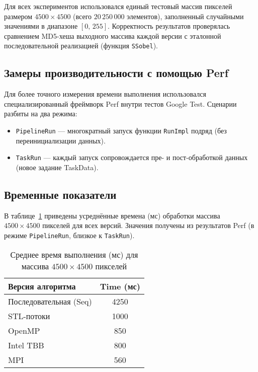 \documentclass[12pt]{article}
\begin{document}
Для всех экспериментов использовался единый тестовый массив пикселей размером $4500 \times 4500$ (всего $20\,250\,000$ элементов), заполненный случайными значениями в диапазоне $[0,\,255]$. Корректность результатов проверялась сравнением MD5-хеша выходного массива каждой версии с эталонной последовательной реализацией (функция \texttt{SSobel}).

\subsection{Замеры производительности с помощью Perf}

Для более точного измерения времени выполнения использовался специализированный фреймворк Perf внутри тестов Google Test. Сценарии разбиты на два режима:
\begin{itemize}
    \item \texttt{PipelineRun} — многократный запуск функции \texttt{RunImpl} подряд (без переинициализации данных).
    \item \texttt{TaskRun} — каждый запуск сопровождается пре- и пост-обработкой данных (новое задание TaskData).
\end{itemize}

\subsection{Временные показатели}

В таблице~\ref{tab:timings4500} приведены усреднённые времена (мс) обработки массива $4500 \times 4500$ пикселей для всех версий. Значения получены из результатов Perf (в режиме \texttt{PipelineRun}, близкое к \texttt{TaskRun}).

\begin{table}[H]
    \centering
    \caption{Среднее время выполнения (мс) для массива $4500\times 4500$ пикселей}
    \label{tab:timings4500}
    \begin{tabular}{|l|c|}
        \hline
        \textbf{Версия алгоритма} & \textbf{Time (мс)} \\
        \hline
        Последовательная (Seq)            & 4250  \\
        STL-потоки                        & 1000  \\
        OpenMP                            &  850  \\
        Intel TBB                         &  800  \\
        MPI                               &  560  \\
        \hline
    \end{tabular}
\end{table}
\end{document}
